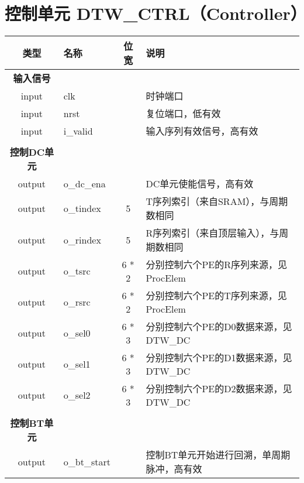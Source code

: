 \documentclass[UTF8]{ctexart}
\begin{document}
\newpage
\section{控制单元 DTW\_CTRL（Controller）}

\begin{table}[!h]
    \centering
    \begin{tabular}{clcl}
        \toprule
        类型 & 名称 & 位宽 & 说明 \\
        \midrule
        \textbf{输入信号} \\[5pt]
        input & clk && 时钟端口 \\[5pt]
        input & nrst && 复位端口，低有效 \\[5pt]
        input & i\_valid && 输入序列有效信号，高有效 \\[5pt]
        \\
        \textbf{控制DC单元} \\[5pt]
        output & o\_dc\_ena && DC单元使能信号，高有效 \\[5pt]
        output & o\_tindex & 5 & T序列索引（来自SRAM），与周期数相同 \\[5pt]
        output & o\_rindex & 5 & R序列索引（来自顶层输入），与周期数相同 \\[5pt]
        output & o\_tsrc & 6 * 2 & 分别控制六个PE的R序列来源，见ProcElem \\[5pt]
        output & o\_rsrc & 6 * 2 & 分别控制六个PE的T序列来源，见ProcElem \\[5pt]
        output & o\_sel0 & 6 * 3 & 分别控制六个PE的D0数据来源，见DTW\_DC \\[5pt]
        output & o\_sel1 & 6 * 3 & 分别控制六个PE的D1数据来源，见DTW\_DC \\[5pt]
        output & o\_sel2 & 6 * 3 & 分别控制六个PE的D2数据来源，见DTW\_DC \\[5pt]
        \\
        \textbf{控制BT单元} \\[5pt]
        output & o\_bt\_start && 控制BT单元开始进行回溯，单周期脉冲，高有效 \\[5pt]
        \bottomrule
    \end{tabular}
\end{table}
\end{document}
